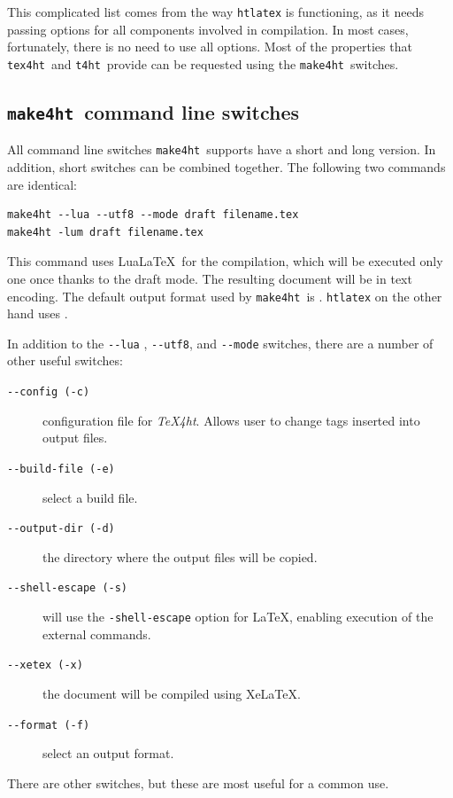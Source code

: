 \documentclass{ltugproc}
\newcommand\term[1]{\textit{#1}}
\newcommand\command[1]{\texttt{#1}}
\newcommand\texfourht{\term{\TeX4ht}}
\newcommand\texfourhtcmd{\command{tex4ht}}
\newcommand\tfourhtcmd{\command{t4ht}}
\newcommand\makefourht{\command{make4ht}}
\newcommand\switch[1]{\texttt{-\/-#1}}
\begin{document}
This complicated list comes from  the way \command{htlatex} is  functioning, 
as it needs passing options for all components involved in
compilation. In most cases, fortunately, there is no need to use all options.
Most of the properties that \texfourhtcmd\ and \tfourhtcmd\ provide can be requested using the
\makefourht\ switches.

\subsection{\makefourht\ command line switches}

All command line switches \makefourht\ supports have a short and long version. In
addition, short switches can be combined together. The following two commands
are identical:


\bgroup\small
\begin{verbatim}
make4ht --lua --utf8 --mode draft filename.tex
make4ht -lum draft filename.tex
\end{verbatim}
\egroup

This command uses Lua\LaTeX\ for the compilation, which will be executed only one
once thanks to the draft mode. The resulting document will be in 
text encoding. The default output format used by \makefourht\ is . \command{htlatex} on the other hand uses .

In addition to the \switch{lua} , \switch{utf8}, and \switch{mode} switches, there are a number of other useful switches:


\begin{description}
  \item[\switch{config (-c)}] configuration file for \texfourht. Allows user to change tags inserted into output files.
  \item[\switch{build-file (-e)}] select a build file.
  \item[\switch{output-dir (-d)}] the directory where the output files will be copied.
  \item[\switch{shell-escape (-s)}] will use the \texttt{-shell-\/escape} option for \LaTeX, enabling execution of the external commands.
  \item[\switch{xetex (-x)}] the document will be compiled using Xe\LaTeX.
  \item[\switch{format (-f)}] select an output format.
\end{description}

There are other switches, but these are most useful for a common use.
\end{document}
